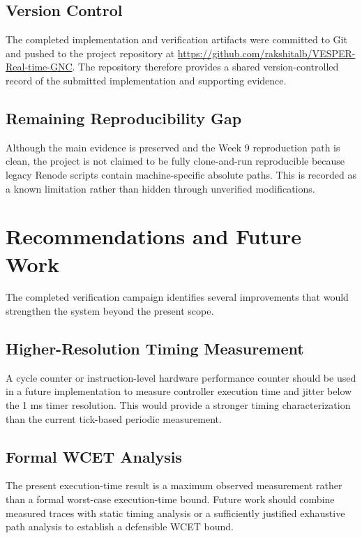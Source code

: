 \documentclass[11pt,a4paper]{article}
\begin{document}
\subsection{Version Control}

The completed implementation and verification artifacts were committed to Git and pushed to the project repository at \url{https://github.com/rakshitalb/VESPER-Real-time-GNC}. The repository therefore provides a shared version-controlled record of the submitted implementation and supporting evidence.

\subsection{Remaining Reproducibility Gap}

Although the main evidence is preserved and the Week 9 reproduction path is clean, the project is not claimed to be fully clone-and-run reproducible because legacy Renode scripts contain machine-specific absolute paths. This is recorded as a known limitation rather than hidden through unverified modifications.


\section{Recommendations and Future Work}

The completed verification campaign identifies several improvements that would strengthen the system beyond the present scope.

\subsection{Higher-Resolution Timing Measurement}

A cycle counter or instruction-level hardware performance counter should be used in a future implementation to measure controller execution time and jitter below the 1 ms timer resolution. This would provide a stronger timing characterization than the current tick-based periodic measurement.

\subsection{Formal WCET Analysis}

The present execution-time result is a maximum observed measurement rather than a formal worst-case execution-time bound. Future work should combine measured traces with static timing analysis or a sufficiently justified exhaustive path analysis to establish a defensible WCET bound.
\end{document}
